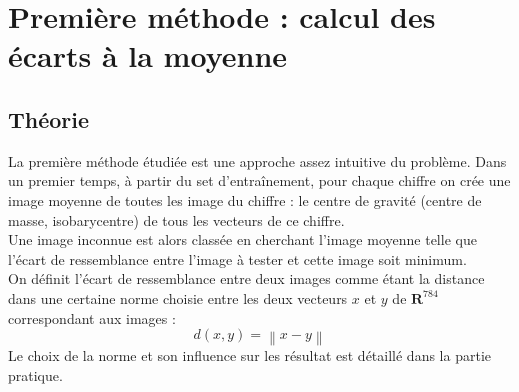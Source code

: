 \documentclass[a4paper,11pt,twoside]{report}
\newcommand{\norm}[1]{\left\lVert#1\right\rVert} %
\begin{document}
\chapter{Première méthode : calcul des écarts à la moyenne} 
\section{Théorie}
La première méthode étudiée est une approche assez intuitive du problème.
Dans un premier temps, à partir du set d’entraînement, pour chaque chiffre on crée une image moyenne de toutes les image du chiffre : le centre de gravité (centre de masse, isobarycentre) de tous les vecteurs de ce chiffre.\\Une image inconnue est alors classée en cherchant l'image moyenne telle que l'écart de ressemblance entre l'image à tester et cette image soit minimum.\\

On définit l'écart de ressemblance entre deux images comme étant la distance dans une certaine norme choisie entre les deux vecteurs $x$ et $y$ de $\textbf{R}^{784}$ correspondant aux images : $$d(x,y) = \norm{x-y}$$ Le choix de la norme et son influence sur les résultat est détaillé dans la partie pratique.
\end{document}
